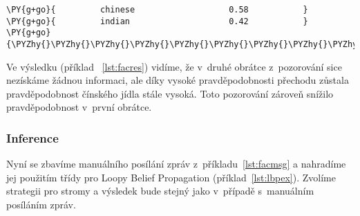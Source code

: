 \begin{example}
\begin{Verbatim}[commandchars=\\\{\}]
\PY{g+go}{         chinese                   0.58           }
\PY{g+go}{         indian                    0.42           }
\PY{g+go}{\PYZhy{}\PYZhy{}\PYZhy{}\PYZhy{}\PYZhy{}\PYZhy{}\PYZhy{}\PYZhy{}\PYZhy{}\PYZhy{}\PYZhy{}\PYZhy{}\PYZhy{}\PYZhy{}\PYZhy{}\PYZhy{}\PYZhy{}\PYZhy{}\PYZhy{}\PYZhy{}\PYZhy{}\PYZhy{}\PYZhy{}\PYZhy{}\PYZhy{}\PYZhy{}\PYZhy{}\PYZhy{}\PYZhy{}\PYZhy{}\PYZhy{}\PYZhy{}\PYZhy{}\PYZhy{}\PYZhy{}\PYZhy{}\PYZhy{}\PYZhy{}\PYZhy{}\PYZhy{}\PYZhy{}\PYZhy{}\PYZhy{}\PYZhy{}\PYZhy{}\PYZhy{}\PYZhy{}\PYZhy{}\PYZhy{}\PYZhy{}}
\end{Verbatim}
\caption{Výsledek inference}
\label{lst:facres}
\end{example}


Ve výsledku (příklad ~\ref{lst:facres}) vidíme, že v~druhé obrátce z~pozorování sice nezískáme žádnou informaci, ale díky vysoké pravděpodobnosti přechodu zůstala pravděpodobnost čínského jídla stále vysoká.
Toto pozorování zároveň snížilo pravděpodobnost v~první obrátce.

\subsubsection{Inference}

Nyní se zbavíme manuálního posílání zpráv z~příkladu~\ref{lst:facmsg} a nahradíme jej použitím třídy pro Loopy Belief Propagation (příklad~\ref{lst:lbpex}). 
Zvolíme strategii pro stromy a výsledek bude stejný jako v~případě s~manuálním posíláním zpráv.

